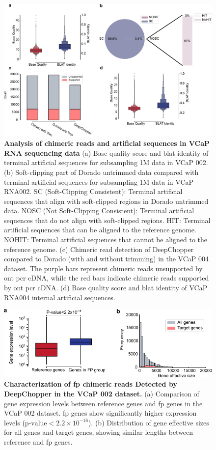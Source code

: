 \documentclass[pdflatex, sn-mathphys-num, lineno]{sn-jnl}%
\theoremstyle{thmstyleone}%
\theoremstyle{thmstyletwo}%
\theoremstyle{thmstylethree}%
\begin{document}
\begin{figure}[!h]
	\includegraphics[height=0.65\columnwidth]{finals/sf1}
	\caption{ {\bf Analysis of chimeric reads and artificial sequences in VCaP RNA sequencing data } (a) Base quality score and \gls{blat} identity of terminal artificial sequences for subsampling 1M data in VCaP 002. (b) Soft-clipping part of Dorado untrimmed data compared with terminal artificial sequences for subsampling 1M data in VCaP RNA002. SC (Soft-Clipping Consistent): Terminal artificial sequences that align with soft-clipped regions in Dorado untrimmed data. NOSC (Not Soft-Clipping Consistent): Terminal artificial sequences that do not align with soft-clipped regions. HIT: Terminal artificial sequences that can be aligned to the reference genome. NOHIT: Terminal artificial sequences that cannot be aligned to the reference genome. (c) Chimeric read detection of DeepChopper compared to Dorado (with and without trimming) in the VCaP 004 dataset. The purple bars represent chimeric reads unsupported by \gls{ont} \gls{pcr} cDNA, while the red bars indicate chimeric reads supported by \gls{ont} \gls{pcr} cDNA.  (d) Base quality score and \gls{blat} identity of VCaP RNA004 internal artificial sequences.}
	\label{fig:sf1}
\end{figure}


\begin{figure}[!h]
	\includegraphics[height=0.32\columnwidth]{finals/sf2}
	\caption{ {\bf Characterization of \gls{fp} chimeric reads Detected by DeepChopper in the VCaP 002 dataset.} 
  (a) Comparison of gene expression levels between reference genes and \gls{fp} genes in the VCaP 002 dataset. \gls{fp} genes show significantly higher expression levels (\(\textrm{p-value} < 2.2 \times 10^{-16}\)). (b) Distribution of gene effective sizes for all genes and target genes, showing similar lengths between reference and \gls{fp} genes.}
	\label{fig:sf2}
\end{figure}
\end{document}
